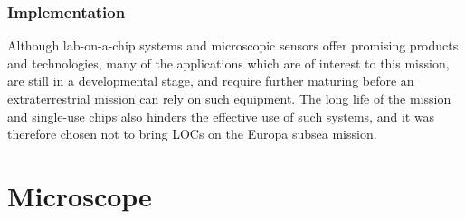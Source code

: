 \subsubsection{Implementation}
Although lab-on-a-chip systems and microscopic sensors offer promising products and technologies, many of the applications which are of interest to this mission, are still in a developmental stage, and require further maturing before an extraterrestrial mission can rely on such equipment. The long life of the mission and single-use chips also hinders the effective use of such systems, and it was therefore chosen not to bring LOCs on the Europa subsea mission.





\section{Microscope}
